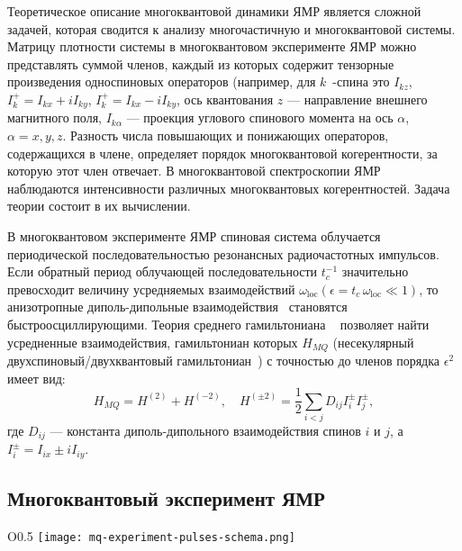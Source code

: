 Теоретическое описание многоквантовой динамики ЯМР является сложной задачей, которая сводится к анализу многочастичную и многоквантовой системы. Матрицу плотности системы в многоквантовом эксперименте ЯМР можно представлять суммой членов, каждый из которых содержит тензорные произведения односпиновых операторов
(например, для $k$~-спина это $I_{kz}$,
$I_k^+ = I_{kx} + iI_{ky}$, $I_k^+ = I_{kx} - iI_{ky}$,
ось квантования $z$ --- направление внешнего магнитного поля,
$I_{k\alpha}$ --- проекция углового спинового момента на ось $\alpha$,
$\alpha=x,y,z$.
Разность числа повышающих и понижающих операторов, содержащихся в члене, определяет порядок многоквантовой когерентности, за которую этот член отвечает.
В многоквантовой спектроскопии ЯМР~\cite{Baum1985} наблюдаются интенсивности различных многоквантовых когерентностей.
Задача теории состоит в их вычислении.

В многоквантовом эксперименте ЯМР спиновая
система облучается периодической последовательностью резонансных радиочастотных импульсов.
Если обратный период облучающей последовательности $t_{c}^{-1}$
значительно превосходит величину усредняемых взаимодействий
$\omega_\mathrm{loc} (\epsilon = t_{c}\, \omega_\mathrm{loc} \ll 1)$,
то анизотропные диполь-дипольные взаимодействия~\cite{Goldman1970} становятся быстроосциллирующими.
Теория среднего гамильтониана ~\cite{Haberlen1969} позволяет найти усредненные взаимодействия,
гамильтониан которых $H_{MQ}$ (несекулярный двухспиновый/двухквантовый гамильтониан~\cite{Baum1985})
с точностью до членов порядка $\epsilon^2$ имеет вид:
\begin{equation}\label{eq:hmq}
    H_{MQ} = H^{(2)} + H^{(-2)},
    \quad
    H^{(\pm2)} = \frac 1 2 \sum_{i < j} D_{ij} I^\pm_i I^\pm_j,
\end{equation}
где $D_{ij}$ --- константа диполь-дипольного взаимодействия спинов $i$ и $j$, а $I^\pm_i = I_{ix} \pm iI_{iy}$.


\subsection{Многоквантовый эксперимент ЯМР}\label{sec:mq-nrm-experiment}

\begin{wrapfigure}{O}{0.5\textwidth}
  \centering
  \texttt{[image: mq-experiment-pulses-schema.png]}
  \caption{\protect}
  \label{fig:mq-experiment-pulses-schema}
\end{wrapfigure}

